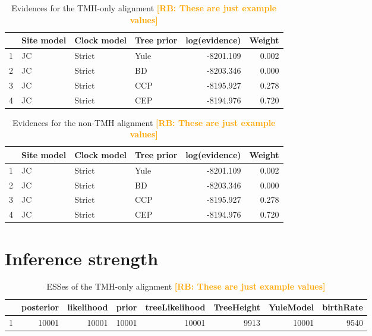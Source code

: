 \documentclass{article}
\newcommand{\richel}[1]{\textcolor{orange}{\textbf{[RB: #1]}}}
\begin{document}
\begin{table}[ht]
\centering
\begin{tabular}{rlllrr}
  \hline
 & Site model & Clock model & Tree prior & log(evidence) & Weight \\ 
  \hline
1 & JC & Strict & Yule & -8201.109 & 0.002 \\ 
  2 & JC & Strict & BD & -8203.346 & 0.000 \\ 
  3 & JC & Strict & CCP & -8195.927 & 0.278 \\ 
  4 & JC & Strict & CEP & -8194.976 & 0.720 \\ 
   \hline
\end{tabular}
\caption{
  Evidences for the TMH-only alignment
  \richel{These are just example values}
} 
\label{tab:evidences_tmh}
\end{table}

\begin{table}[ht]
\centering
\begin{tabular}{rlllrr}
  \hline
 & Site model & Clock model & Tree prior & log(evidence) & Weight \\ 
  \hline
1 & JC & Strict & Yule & -8201.109 & 0.002 \\ 
  2 & JC & Strict & BD & -8203.346 & 0.000 \\ 
  3 & JC & Strict & CCP & -8195.927 & 0.278 \\ 
  4 & JC & Strict & CEP & -8194.976 & 0.720 \\ 
   \hline
\end{tabular}
\caption{
  Evidences for the non-TMH alignment
  \richel{These are just example values}
} 
\label{tab:evidences_non_tmh}
\end{table}

\section{Inference strength}

\begin{table}[ht]
\centering
\begin{tabular}{rrrrrrrr}
  \hline
 & posterior & likelihood & prior & treeLikelihood & TreeHeight & YuleModel & birthRate \\ 
  \hline
1 & 10001 & 10001 & 10001 & 10001 & 9913 & 10001 & 9540 \\ 
   \hline
\end{tabular}
\caption{
  ESSes of the TMH-only alignment
  \richel{These are just example values}
} 
\label{tab:esses_tmh}
\end{table}
\end{document}
